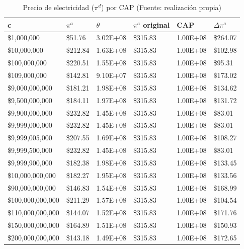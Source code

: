 \begin{table}[H]
    \centering
    \begin{tabular}{|l|l|l|l|l|l|}
    \hline
        c & $\pi^a$ & $\theta$ & $\pi^a$ original &  CAP& $\Delta \pi^a$    \\ \hline
         \$1,000,000  &  \$51.76  & 3.02E+08 &  \$315.83  & 1.00E+08 &  \$264.07   \\ \hline
         \$10,000,000  &  \$212.84  & 1.63E+08 &  \$315.83  & 1.00E+08 &  \$102.98   \\ \hline
         \$100,000,000  &  \$220.51  & 1.55E+08 &  \$315.83  & 1.00E+08 &  \$95.31   \\ \hline
         \$109,000,000  &  \$142.81  & 9.10E+07 &  \$315.83  & 1.00E+08 &  \$173.02   \\ \hline
         \$9,000,000,000  &  \$181.21  & 1.98E+08 &  \$315.83  & 1.00E+08 &  \$134.62   \\ \hline
         \$9,500,000,000  &  \$184.11  & 1.97E+08 &  \$315.83  & 1.00E+08 &  \$131.72   \\ \hline
         \$9,900,000,000  &  \$232.82  & 1.45E+08 &  \$315.83  & 1.00E+08 &  \$83.01   \\ \hline
         \$9,999,000,000  &  \$232.82  & 1.45E+08 &  \$315.83  & 1.00E+08 &  \$83.01   \\ \hline
         \$9,999,005,000  &  \$207.55  & 1.69E+08 &  \$315.83  & 1.00E+08 &  \$108.27   \\ \hline
         \$9,999,500,000  &  \$232.82  & 1.45E+08 &  \$315.83  & 1.00E+08 &  \$83.01   \\ \hline
         \$9,999,900,000  &  \$182.38  & 1.98E+08 &  \$315.83  & 1.00E+08 &  \$133.45   \\ \hline
         \$10,000,000,000  &  \$182.27  & 1.95E+08 &  \$315.83  & 1.00E+08 &  \$133.56   \\ \hline
         \$90,000,000,000  &  \$146.83  & 1.54E+08 &  \$315.83  & 1.00E+08 &  \$168.99   \\ \hline
         \$100,000,000,000  &  \$211.29  & 1.57E+08 &  \$315.83  & 1.00E+08 &  \$104.54   \\ \hline
         \$110,000,000,000  &  \$144.07  & 1.52E+08 &  \$315.83  & 1.00E+08 &  \$171.76   \\ \hline
         \$150,000,000,000  &  \$164.89  & 1.51E+08 &  \$315.83  & 1.00E+08 &  \$150.93   \\ \hline
         \$200,000,000,000  &  \$143.18  & 1.49E+08 &  \$315.83  & 1.00E+08 &  \$172.65   \\ \hline
    \end{tabular}
    \caption{{\footnotesize Precio de electricidad ($\pi^d$) por CAP (Fuente: realización propia)}}
    \label{calibracioncuadrado}
\end{table}

